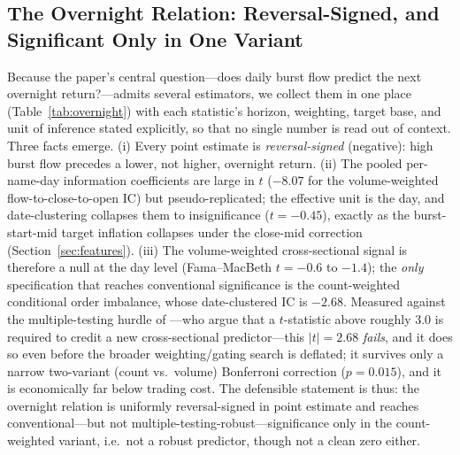 \documentclass[11pt]{article}
\begin{document}
\subsection{The Overnight Relation: Reversal-Signed, and Significant Only in One Variant}
\label{sec:signsign}
Because the paper's central question---does daily burst flow predict the next overnight return?---admits several estimators, we collect them in one place (Table~\ref{tab:overnight}) with each statistic's horizon, weighting, target base, and unit of inference stated explicitly, so that no single number is read out of context. Three facts emerge. (i) Every point estimate is \emph{reversal-signed} (negative): high burst flow precedes a lower, not higher, overnight return. (ii) The pooled per-name-day information coefficients are large in $t$ ($-8.07$ for the volume-weighted flow-to-close-to-open IC) but pseudo-replicated; the effective unit is the day, and date-clustering collapses them to insignificance ($t=-0.45$), exactly as the burst-start-mid target inflation collapses under the close-mid correction (Section~\ref{sec:features}). (iii) The volume-weighted cross-sectional signal is therefore a null at the day level (Fama--MacBeth $t=-0.6$ to $-1.4$); the \emph{only} specification that reaches conventional significance is the count-weighted conditional order imbalance, whose date-clustered IC is $-2.68$. Measured against the multiple-testing hurdle of \citet{harvey2016}---who argue that a $t$-statistic above roughly $3.0$ is required to credit a new cross-sectional predictor---this $|t|=2.68$ \emph{fails}, and it does so even before the broader weighting/gating search is deflated; it survives only a narrow two-variant (count vs.\ volume) Bonferroni correction ($p=0.015$), and it is economically far below trading cost. The defensible statement is thus: the overnight relation is uniformly reversal-signed in point estimate and reaches conventional---but not multiple-testing-robust---significance only in the count-weighted variant, i.e.\ not a robust predictor, though not a clean zero either.
\end{document}

